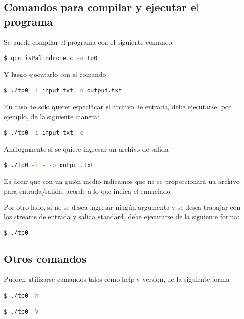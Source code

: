 \documentclass[a4paper]{article}
\begin{document}
\subsection{Comandos para compilar y ejecutar el programa}

Se puede compilar el programa con el siguiente comando:

\begin{lstlisting}[language=bash]
  $ gcc isPalindrome.c -o tp0
\end{lstlisting}


Y luego ejecutarlo con el comando:

\begin{lstlisting}[language=bash]
  $ ./tp0 -i input.txt -o output.txt
\end{lstlisting}

En caso de sólo querer especificar el archivo de entrada, debe ejecutarse, por ejemplo, de la siguiente manera:

\begin{lstlisting}[language=bash]
  $ ./tp0 -i input.txt -o -
\end{lstlisting}

Análogamente si se quiere ingresar un archivo de salida:

\begin{lstlisting}[language=bash]
  $ ./tp0 -i - -o output.txt
\end{lstlisting}

Es decir que con un guión medio indicamos que no se proporcionará un archivo para entrada/salida, acorde a lo que indica el enunciado.

Por otro lado, si no se desea ingresar ningún argumento y se desea trabajar con los streams de entrada y salida standard, debe ejecutarse de la siguiente forma:

\begin{lstlisting}[language=bash]
  $ ./tp0
\end{lstlisting}

\subsection{Otros comandos}

Pueden utilizarse comandos tales como help y version, de la siguiente forma:

\begin{lstlisting}[language=bash]
  $ ./tp0 -h
\end{lstlisting}

\begin{lstlisting}[language=bash]
  $ ./tp0 -V
\end{lstlisting}
\end{document}

